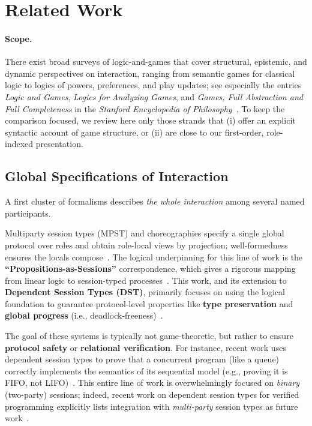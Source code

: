 \section{Related Work}
\label{sec:related}

\paragraph{Scope.}
There exist broad surveys of logic-and-games that cover structural, epistemic, and dynamic perspectives on interaction, ranging from semantic games for classical logic to logics of powers, preferences, and play updates; see especially the entries \emph{Logic and Games}, \emph{Logics for Analyzing Games}, and \emph{Games, Full Abstraction and Full Completeness} in the \emph{Stanford Encyclopedia of Philosophy}~\cite{sep-logics-for-games,sep-logic-games,sep-games-abstraction}.
To keep the comparison focused, we review here only those strands that (i) offer an explicit syntactic account of game structure, or (ii) are close to our first-order, role-indexed presentation.

\subsection{Global Specifications of Interaction}
A first cluster of formalisms describes \emph{the whole interaction} among several named participants.

Multiparty session types (MPST) and choreographies specify a single global protocol over roles and obtain role-local views by projection; well-formedness ensures the locals compose~\cite{HondaYoshidaCarbone2008MPST}. The logical underpinning for this line of work is the \textbf{``Propositions-as-Sessions''} correspondence, which gives a rigorous mapping from linear logic to session-typed processes~\cite{wadler2012propositions,caires2010session}. This work, and its extension to \textbf{Dependent Session Types (DST)}, primarily focuses on using the logical foundation to guarantee protocol-level properties like \textbf{type preservation} and \textbf{global progress} (i.e., deadlock-freeness)~\cite{ToninhoCairesPfenningDependentSessionTypes}.

The goal of these systems is typically not game-theoretic, but rather to ensure \textbf{protocol safety} or \textbf{relational verification}. For instance, recent work uses dependent session types to prove that a concurrent program (like a queue) correctly implements the semantics of its sequential model (e.g., proving it is FIFO, not LIFO)~\cite{fu2025dependentsessiontypesverified}. This entire line of work is overwhelmingly focused on \emph{binary} (two-party) sessions; indeed, recent work on dependent session types for verified programming explicitly lists integration with \emph{multi-party} session types as future work~\cite{fu2025dependentsessiontypesverified}.

